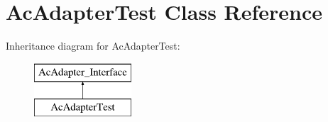 \hypertarget{class_ac_adapter_test}{\section{\-Ac\-Adapter\-Test \-Class \-Reference}
\label{class_ac_adapter_test}
}
\-Inheritance diagram for \-Ac\-Adapter\-Test\-:\begin{figure}[H]
\begin{center}
\leavevmode
\includegraphics[height=2.000000cm]{class_ac_adapter_test}
\end{center}
\end{figure}
